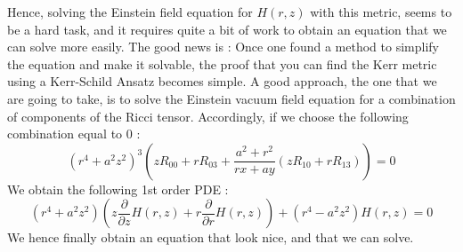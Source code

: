 \documentclass[a4paper,12pt]{article}
\theoremstyle{definition}
\begin{document}
Hence, solving the Einstein field equation for $H(r,z)$ with this metric, seems to be a hard task,
and it requires quite a bit of work to obtain an equation that we can solve more easily.
The good news is : Once one found a method to simplify the equation and make it solvable, the proof that you can find the Kerr metric using a Kerr-Schild Ansatz becomes simple.
A good approach, the one that we are going to take, is to solve the Einstein vacuum field equation for a combination of components of the Ricci tensor.
Accordingly, if we choose the following combination equal to $0$ :
\begin{equation}
	(r^4+a^2z^2)^3(zR_{00}+rR_{03}+\frac{a^2+r^2}{rx+ay}(zR_{10}+rR_{13}))=0
\end{equation}
We obtain the following 1st order PDE :
\begin{equation}\label{Kerr:equation}
	(r^4+a^2z^2)(z \frac{\partial}{\partial z}H(r,z)+r\frac{\partial}{\partial r}H(r,z))+(r^4-a^2 z^2) H(r,z)=0
\end{equation}
We hence finally obtain an equation that look nice, and that we can solve.
\end{document}
